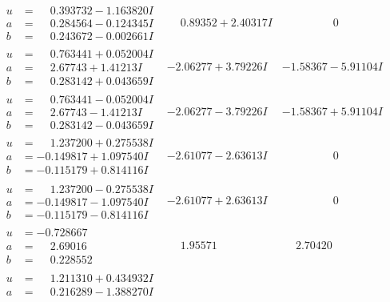 \documentclass[1p]{elsarticle_modified}
\theoremstyle{definition}
\begin{document}
$$\begin{array}{c|c|c}
\begin{aligned}
u &= \phantom{-}0.393732 - 1.163820 I \\
a &= \phantom{-}0.284564 - 0.124345 I \\
b &= \phantom{-}0.243672 - 0.002661 I\end{aligned}
 & \phantom{-}0.89352 + 2.40317 I & \phantom{-0.000000 } 0 \\ \hline\begin{aligned}
u &= \phantom{-}0.763441 + 0.052004 I \\
a &= \phantom{-}2.67743 + 1.41213 I \\
b &= \phantom{-}0.283142 + 0.043659 I\end{aligned}
 & -2.06277 + 3.79226 I & -1.58367 - 5.91104 I \\ \hline\begin{aligned}
u &= \phantom{-}0.763441 - 0.052004 I \\
a &= \phantom{-}2.67743 - 1.41213 I \\
b &= \phantom{-}0.283142 - 0.043659 I\end{aligned}
 & -2.06277 - 3.79226 I & -1.58367 + 5.91104 I \\ \hline\begin{aligned}
u &= \phantom{-}1.237200 + 0.275538 I \\
a &= -0.149817 + 1.097540 I \\
b &= -0.115179 + 0.814116 I\end{aligned}
 & -2.61077 - 2.63613 I & \phantom{-0.000000 } 0 \\ \hline\begin{aligned}
u &= \phantom{-}1.237200 - 0.275538 I \\
a &= -0.149817 - 1.097540 I \\
b &= -0.115179 - 0.814116 I\end{aligned}
 & -2.61077 + 2.63613 I & \phantom{-0.000000 } 0 \\ \hline\begin{aligned}
u &= -0.728667\phantom{ +0.000000I} \\
a &= \phantom{-}2.69016\phantom{ +0.000000I} \\
b &= \phantom{-}0.228552\phantom{ +0.000000I}\end{aligned}
 & \phantom{-}1.95571\phantom{ +0.000000I} & \phantom{-}2.70420\phantom{ +0.000000I} \\ \hline\begin{aligned}
u &= \phantom{-}1.211310 + 0.434932 I \\
a &= \phantom{-}0.216289 - 1.388270 I \\

\end{aligned}
\end{array}$$
\end{document}
